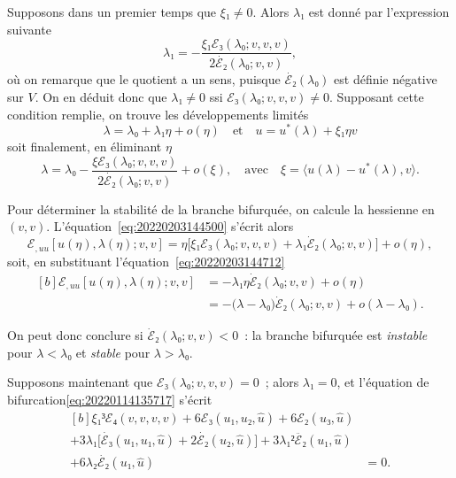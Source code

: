 \documentclass[12pt, final]{amsart}
\begin{document}
Supposons dans un premier temps que \(ξ₁≠0\). Alors \(λ₁\) est donné par
l'expression suivante
\begin{equation}
  λ₁=-\frac{ξ₁ℰ₃(λ₀;v, v, v)}{2\dot{ℰ₂}(λ₀;v, v)},
\end{equation}
où on remarque que le quotient a un sens, puisque \(\dot{ℰ₂}(λ₀)\) est définie
négative sur \(V\). On en déduit donc que \(λ₁≠0\) ssi \(ℰ₃(λ₀;v, v,
v)≠0\). Supposant cette condition remplie, on trouve les développements limités
\begin{equation}
  λ=λ₀+λ₁η+o(η)
  \quad\text{et}\quad
  u=u^*(λ)+ξ₁ηv
\end{equation}
soit finalement, en éliminant \(η\)
\begin{equation}
  λ=λ₀-\frac{ξℰ₃(λ₀;v, v, v)}{2\dot{ℰ₂}(λ₀;v, v)}+o(ξ),
  \quad\text{avec}\quad
  ξ=〈u(λ)-u^*(λ), v〉.
\end{equation}

Pour déterminer la stabilité de la branche bifurquée, on calcule la hessienne
en \((v, v)\). L'équation~\eqref{eq:20220203144500} s'écrit alors
\begin{equation}
  ℰ_{,uu}[u(η), λ(η); v, v]
  =η\bigl[ξ₁ℰ₃(λ₀; v, v, v)+λ₁\dot{ℰ}₂(λ₀; v, v)\bigr]+o(η),
\end{equation}
soit, en substituant l'équation~\eqref{eq:20220203144712}
\begin{equation}
  \begin{aligned}[b]
    ℰ_{,uu}[u(η), λ(η); v, v]
    &=-λ₁η\dot{ℰ}₂(λ₀; v, v)+o(η)\\
    &=-\bigl(λ-λ₀\bigr)\dot{ℰ}₂(λ₀; v, v)+o(λ-λ₀).
  \end{aligned}
\end{equation}

On peut donc conclure si \(\dot{ℰ}₂(λ₀; v, v)<0\)~: la branche bifurquée est
\emph{instable} pour \(λ<λ₀\) et \emph{stable} pour \(λ>λ₀\).

Supposons maintenant que \(ℰ₃(λ₀;v, v, v)=0\)~; alors \(λ₁=0\), et l'équation
de bifurcation\eqref{eq:20220114135717} s'écrit
\begin{equation}
  \begin{aligned}[b]
    ξ₁³ℰ₄(v, v, v, v)+6ℰ₃(u₁, u₂, \hat{u})+6ℰ₂(u₃, \hat{u})&\\
    +3λ₁\bigl[\dot{ℰ₃}(u₁, u₁, \hat{u})+2\dot{ℰ₂}(u₂, \hat{u})\bigr]
    +3λ₁²\ddot{ℰ₂}(u₁, \hat{u})&\\
    +6λ₂\dot{ℰ₂}(u₁, \hat{u})&=0.
  \end{aligned}
\end{equation}
\end{document}
